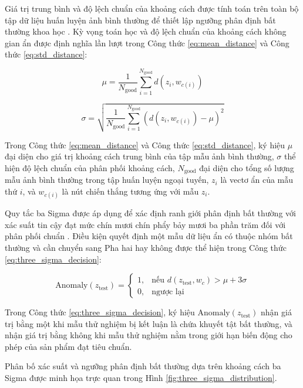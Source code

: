 Giá trị trung bình và độ lệch chuẩn của khoảng cách được tính toán trên toàn bộ tập dữ liệu huấn luyện ảnh bình thường để thiết lập ngưỡng phân định bất thường khoa học \cite{hawkins1980identification}. Kỳ vọng toán học và độ lệch chuẩn của khoảng cách không gian ẩn được định nghĩa lần lượt trong Công thức \ref{eq:mean_distance} và Công thức \ref{eq:std_distance}:

\begin{equation}
\mu = \frac{1}{N_{\text{good}}} \sum_{i=1}^{N_{\text{good}}} d(z_i, w_{c(i)})
\label{eq:mean_distance}
\end{equation}

\begin{equation}
\sigma = \sqrt{\frac{1}{N_{\text{good}}} \sum_{i=1}^{N_{\text{good}}} \left( d(z_i, w_{c(i)}) - \mu \right)^2}
\label{eq:std_distance}
\end{equation}

Trong Công thức \ref{eq:mean_distance} và Công thức \ref{eq:std_distance}, ký hiệu $\mu$ đại diện cho giá trị khoảng cách trung bình của tập mẫu ảnh bình thường, $\sigma$ thể hiện độ lệch chuẩn của phân phối khoảng cách, $N_{\text{good}}$ đại diện cho tổng số lượng mẫu ảnh bình thường trong tập huấn luyện ngoại tuyến, $z_i$ là vectơ ẩn của mẫu thứ $i$, và $w_{c(i)}$ là nút chiến thắng tương ứng với mẫu $z_i$.

Quy tắc ba Sigma được áp dụng để xác định ranh giới phân định bất thường với xác suất tin cậy đạt mức chín mươi chín phẩy bảy mươi ba phần trăm đối với phân phối chuẩn \cite{pukelsheim1994three}. Điều kiện quyết định một mẫu dữ liệu ẩn có thuộc nhóm bất thường và cần chuyển sang Pha hai hay không được thể hiện trong Công thức \ref{eq:three_sigma_decision}:

\begin{equation}
\text{Anomaly}(z_{\text{test}}) = \begin{cases} 1, & \text{nếu } d(z_{\text{test}}, w_c) > \mu + 3\sigma \\ 0, & \text{ngược lại} \end{cases}
\label{eq:three_sigma_decision}
\end{equation}

Trong Công thức \ref{eq:three_sigma_decision}, ký hiệu $\text{Anomaly}(z_{\text{test}})$ nhận giá trị bằng một khi mẫu thử nghiệm bị kết luận là chứa khuyết tật bất thường, và nhận giá trị bằng không khi mẫu thử nghiệm nằm trong giới hạn biến động cho phép của sản phẩm đạt tiêu chuẩn.

Phân bố xác suất và ngưỡng phân định bất thường dựa trên khoảng cách ba Sigma được minh họa trực quan trong Hình \ref{fig:three_sigma_distribution}.

